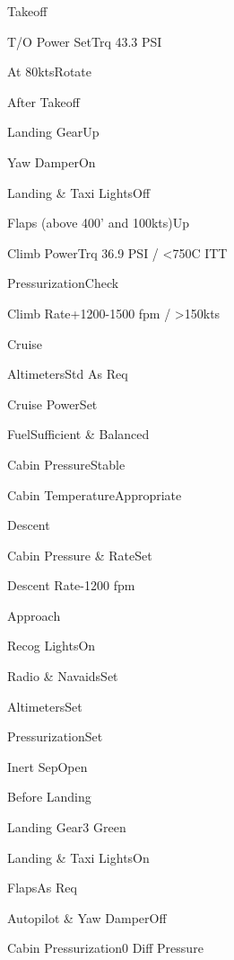 \documentclass[sim-use]{checklist}
\begin{document}
\begin{checklist}{Takeoff}
  \item{T/O Power Set}{Trq 43.3 PSI}
  \item{At 80kts}{Rotate}
\end{checklist}

\begin{checklist}{After Takeoff}
  \item{Landing Gear}{Up}
  \item{Yaw Damper}{On}
  \item{Landing \& Taxi Lights}{Off}
  \item{Flaps (above 400' and 100kts)}{Up}
  \item{Climb Power}{Trq 36.9 PSI / <750C ITT}
  \item{Pressurization}{Check}
  \item{Climb Rate}{+1200-1500 fpm / >150kts}
\end{checklist}

\begin{checklist}{Cruise}
  \item{Altimeters}{Std As Req}
  \item{Cruise Power}{Set}
  \item{Fuel}{Sufficient \& Balanced}
  \item{Cabin Pressure}{Stable}
  \item{Cabin Temperature}{Appropriate}
\end{checklist}

\begin{checklist}{Descent}
  \item{Cabin Pressure \& Rate}{Set}
  \item{Descent Rate}{-1200 fpm}
\end{checklist}

\begin{checklist}{Approach}
  \item{Recog Lights}{On}
  \item{Radio \& Navaids}{Set}
  \item{Altimeters}{Set}
  \item{Pressurization}{Set}
  \item{Inert Sep}{Open}
\end{checklist}

\begin{checklist}{Before Landing}
  \item{Landing Gear}{3 Green}
  \item{Landing \& Taxi Lights}{On}
  \item{Flaps}{As Req}
  \item{Autopilot \& Yaw Damper}{Off}
  \item{Cabin Pressurization}{0 Diff Pressure}
\end{checklist}
\end{document}
